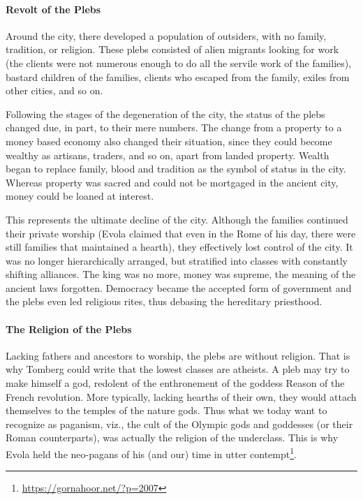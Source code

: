 \paragraph{Revolt of the Plebs}
Around the city, there developed a population of outsiders, with no family, tradition, or religion. These plebs consisted of alien migrants looking for work (the clients were not numerous enough to do all the servile work of the families), bastard children of the families, clients who escaped from the family, exiles from other cities, and so on.

Following the stages of the degeneration of the city, the status of the plebs changed due, in part, to their mere numbers. The change from a property to a money based economy also changed their situation, since they could become wealthy as artisans, traders, and so on, apart from landed property. Wealth began to replace family, blood and tradition as the symbol of status in the city. Whereas property was sacred and could not be mortgaged in the ancient city, money could be loaned at interest. 

This represents the ultimate decline of the city. Although the families continued their private worship (Evola claimed that even in the Rome of his day, there were still families that maintained a hearth), they effectively lost control of the city. It was no longer hierarchically arranged, but stratified into classes with constantly shifting alliances. The king was no more, money was supreme, the meaning of the ancient laws forgotten. Democracy became the accepted form of government and the plebs even led religious rites, thus debasing the hereditary priesthood.

\paragraph{The Religion of the Plebs}
Lacking fathers and ancestors to worship, the plebs are without religion. That is why Tomberg could write that the lowest classes are atheists. A pleb may try to make himself a god, redolent of the enthronement of the goddess Reason of the French revolution. More typically, lacking hearths of their own, they would attach themselves to the temples of the nature gods. Thus what we today want to recognize as paganism, viz., the cult of the Olympic gods and goddesses (or their Roman counterparts), was actually the religion of the underclass. This is why Evola held the neo-pagans of his (and our) time in utter contempt\footnote{\url{https://gornahoor.net/?p=2007}}.

